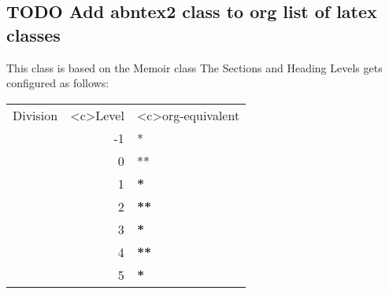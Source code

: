\documentclass[11pt]{article}
\begin{document}
\subsection*{{\bfseries\sffamily TODO} Add abntex2 class to org list of latex classes}
\label{sec:org889ce80}
This class is based on the Memoir class
The Sections and Heading Levels gets configured as follows:

\begin{center}
\begin{tabular}{lrl}
Division & <c>Level & <c>org-equivalent\\
\part & -1 & *\\
\chapter & 0 & **\\
\section & 1 & \textbf{*}\\
\subsection & 2 & \textbf{**}\\
\subsubsection & 3 & \textbf{\textbf{*}}\\
\paragraph & 4 & \textbf{\textbf{**}}\\
\subparagraph & 5 & \textbf{\textbf{\textbf{*}}}\\
\end{tabular}
\end{center}
\end{document}
